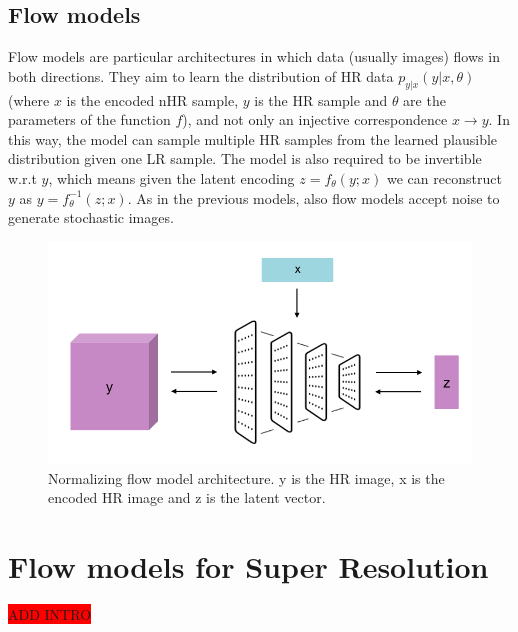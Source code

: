 \documentclass{article}
\begin{document}
\subsection{Flow models}
Flow models are particular architectures in which data (usually images) flows in both directions. They aim to learn the distribution of HR data $p_{y|x}(y|x, \theta)$ (where $x$ is the encoded nHR sample, $y$ is the HR sample and $\theta$ are the parameters of the function $f$), and not only an injective correspondence $x \rightarrow y$. In this way, the model can sample multiple HR samples from the learned plausible distribution given one LR sample. The model is also required to be invertible w.r.t $y$, which means given the latent encoding $z = f_{\theta}(y;x)$ we can reconstruct $y$ as $y = f_{\theta}^{-1}(z;x)$. As in the previous models, also flow models accept noise to generate stochastic images.
\begin{figure}[h]
    \centering
    \includegraphics[scale=.6]{flow.png}
    \caption{Normalizing flow model architecture. y is the HR image, x is the encoded HR image and z is the latent vector.}
    \label{img:vae}
\end{figure}


\newpage
\section{Flow models for Super Resolution}\label{sec:model} %
\colorbox{red}{ADD INTRO} \\
\end{document}

